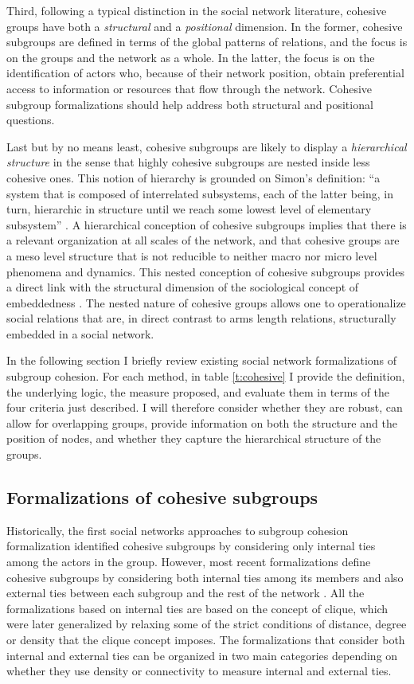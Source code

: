 Third, following a typical distinction in the social network literature, cohesive groups have both a \emph{structural} and a \emph{positional} dimension. In the former, cohesive subgroups are defined in terms of the global patterns of relations, and the focus is on the groups and the network as a whole. In the latter, the focus is on the identification of actors who, because of their network position, obtain preferential access to information or resources that flow through the network. Cohesive subgroup formalizations should help address both structural and positional questions. 

Last but by no means least, cohesive subgroups are likely to display a \emph{hierarchical structure} in the sense that highly cohesive subgroups are nested inside less cohesive ones. This notion of hierarchy is grounded on Simon's definition: ``a system that is composed of interrelated subsystems, each of the latter being, in turn, hierarchic in structure until we reach some lowest level of elementary subsystem'' \citep[468]{simon:1962}. A hierarchical conception of cohesive subgroups implies that there is a relevant organization at all scales of the network, and that cohesive groups are a meso level structure that is not reducible to neither macro nor micro level phenomena and dynamics. This nested conception of cohesive subgroups provides a direct link with the structural dimension of the sociological concept of embeddedness \citep{granovetter:1985}. The nested nature of cohesive groups allows one to operationalize social relations that are, in direct contrast to arms length relations, structurally embedded in a social network.

In the following section I briefly review existing social network formalizations of subgroup cohesion.  For each method, in table \ref{t:cohesive} I provide the definition, the underlying logic, the measure proposed, and evaluate them in terms of the four criteria just described. I will therefore consider whether they are robust, can allow for overlapping groups, provide information on both the structure and the position of nodes, and whether they capture the hierarchical structure of the groups.

\subsection{Formalizations of cohesive subgroups}

Historically, the first social networks approaches to subgroup cohesion formalization identified cohesive subgroups by considering only internal ties among the actors in the group. However, most recent formalizations define cohesive subgroups by considering both internal ties among its members and also external ties between each subgroup and the rest of the network \citep{wasserman:1994}. All the formalizations based on internal ties are based on the concept of clique, which were later generalized by relaxing some of the strict conditions of distance, degree or density that the clique concept imposes.  The formalizations that consider both internal and external ties can be organized in two main categories depending on whether they use density or connectivity to measure internal and external ties.

